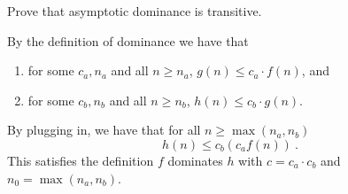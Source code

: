 \begin{flex}

  \begin{exercise}
    Prove that asymptotic dominance is transitive.
  \end{exercise}

  \begin{solution}
    By the definition of dominance we have that 
    \begin{enumerate}
    \item 
      for some $c_a, n_a$ and all $n \geq n_a$,  $g(n) \leq c_a \cdot f(n)$,
      and
    \item
      for some $c_b, n_b$ and all $n \geq n_b$,  $h(n) \leq c_b \cdot g(n)$.
    \end{enumerate}
    By plugging in, we have that for all $n \geq \max(n_a,n_b)$
    \[h(n) \leq c_b (c_a f(n))~.\]
    This satisfies the definition  $f$ dominates $h$ with $c = c_a
    \cdot c_b$ and $n_0 = \max(n_a,n_b)$.
  \end{solution}

\end{flex}





